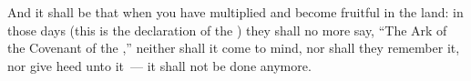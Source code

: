 
\begin{inparaenum}
  
  
   And it shall be that when you have multiplied and become fruitful in the land: in those days (this is the declaration of the \lord) they shall no more say, ``The Ark of the Covenant of the \lord,'' neither shall it come to mind, nor shall they remember it, nor give heed unto it~--- it shall not be done anymore.%
  
\end{inparaenum}
